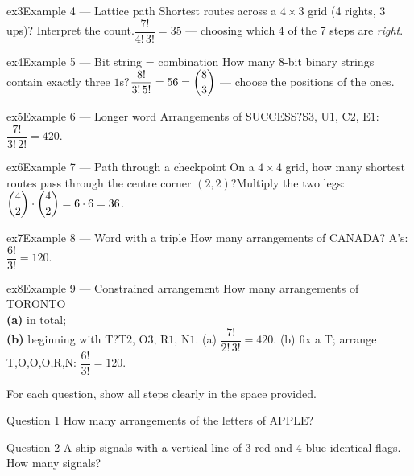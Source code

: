 \documentclass[11pt]{article}
\begin{document}
\begin{example}{ex3}{Example 4 --- Lattice path}
Shortest routes across a $4\times3$ grid (4 rights, 3 ups)? Interpret the count.\soln $\dfrac{7!}{4!\,3!}=35$ --- choosing which 4 of the 7 steps are \emph{right}.
\end{example}

\begin{example}{ex4}{Example 5 --- Bit string = combination}
How many 8-bit binary strings contain exactly three $1$s?\soln $\dfrac{8!}{3!\,5!}=56=\dbinom{8}{3}$ --- choose the positions of the ones.
\end{example}

\begin{example}{ex5}{Example 6 --- Longer word}
Arrangements of SUCCESS?\soln S$3$, U$1$, C$2$, E$1$: $\dfrac{7!}{3!\,2!}=420$.
\end{example}

\begin{example}{ex6}{Example 7 --- Path through a checkpoint}
On a $4\times4$ grid, how many shortest routes pass through the centre corner $(2,2)$?\soln Multiply the two legs: $\dbinom{4}{2}\cdot\dbinom{4}{2}=6\cdot6=36$.
\end{example}

\begin{example}{ex7}{Example 8 --- Word with a triple}
How many arrangements of CANADA? A's: $\dfrac{6!}{3!}=120$.
\end{example}

\begin{example}{ex8}{Example 9 --- Constrained arrangement}
How many arrangements of TORONTO \\ \textbf{(a)} in total; \\ \textbf{(b)} beginning with T?\soln T$2$, O$3$, R$1$, N$1$. (a) $\dfrac{7!}{2!\,3!}=420$. (b) fix a T; arrange T,O,O,O,R,N: $\dfrac{6!}{3!}=120$.
\end{example}

\clearpage
{}
For each question, show all steps clearly in the space provided.

\begin{qbox}{Question 1}
How many arrangements of the letters of APPLE?\workspace{2.4cm}
\end{qbox}

\begin{qbox}{Question 2}
A ship signals with a vertical line of 3 red and 4 blue identical flags. How many signals?\workspace{2.4cm}
\end{qbox}
\end{document}
